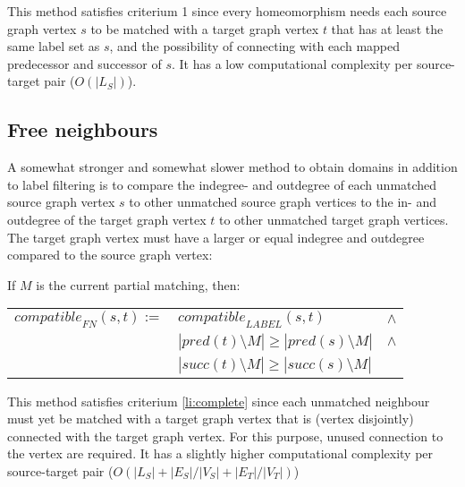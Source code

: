 This method satisfies criterium 1 since every homeomorphism needs each source graph vertex $s$ to be matched with a target graph vertex $t$ that has at least the same label set as $s$, and the possibility of connecting with each mapped predecessor and successor of $s$. It has a low computational complexity per source-target pair ($O(|L_S|)$).

\subsection{Free neighbours}
A somewhat stronger and somewhat slower method to obtain domains in addition to label filtering is to compare the indegree- and outdegree of each unmatched source graph vertex $s$ to other unmatched source graph vertices to the in- and outdegree of the target graph vertex $t$ to other unmatched target graph vertices. The target graph vertex must have a larger or equal indegree and outdegree compared to the source graph vertex:


\begin{minipage}{\textwidth}
\begin{defn} If $M$ is the current partial matching, then:


\begin{center}
\bgroup
\def\arraystretch{1.2}
\setlength\tabcolsep{5pt}
\begin{tabular}{lll}
\centering
$\mathit{compatible}_{\mathit{FN}}(s,t) := $&$\mathit{compatible}_{\mathit{LABEL}}(s,t)$&$\land$\\
&$ |\mathit{pred}(t) \setminus M| \geq |\mathit{pred}(s) \setminus M|$&$\land$\\
&$ |\mathit{succ}(t) \setminus M| \geq |\mathit{succ}(s) \setminus M|$
\end{tabular}
\egroup
\end{center}
 
\end{defn}
\end{minipage}

This method satisfies criterium \ref{li:complete} since each unmatched neighbour must yet be matched with a target graph vertex that is (vertex disjointly) connected with the target graph vertex. For this purpose, unused connection to the vertex are required. It has a slightly higher computational complexity per source-target pair ($O(|L_S| + |E_S|/|V_S| + |E_T|/|V_T|)$)


